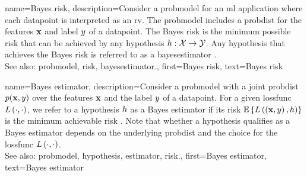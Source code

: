 {name={Bayes risk},
	description={Consider a \gls{probmodel} for an \gls{ml} application where each 
		\gls{datapoint} is interpreted as an \gls{rv}. The \gls{probmodel} includes 
		a \gls{probdist} for the \glspl{feature} ${\bf x}$ and \gls{label} $y$ 
		of a \gls{datapoint}. The Bayes \gls{risk} is the \gls{minimum} 
		possible \gls{risk} that can be achieved by any \gls{hypothesis} $h: \mathcal{X} \rightarrow \mathcal{Y}$. 
		Any \gls{hypothesis} that achieves the Bayes \gls{risk} is referred to as a 
		\gls{bayesestimator} \cite{LC}.
		\\
		See also: \gls{probmodel}, \gls{risk}, \gls{bayesestimator}.},
	first={Bayes risk},
	text={Bayes risk}
}
	
{name={Bayes estimator},
	description={Consider a \gls{probmodel} with a joint \gls{probdist} 
		$p({\bf x},y)$ over the \glspl{feature} ${\bf x}$ and the \gls{label} $y$ 
		of a \gls{datapoint}. For a given \gls{lossfunc} $L\left(\cdot,\cdot \right)$, we refer to a \gls{hypothesis} 
		$h$ as a Bayes \gls{estimator} if its \gls{risk} 
		$\mathbb{E}\left\{L\left(\left( {\bf x},y \right),h \right)\right\}$
		is the \gls{minimum} achievable \gls{risk} \cite{LC}. 
		Note that whether a \gls{hypothesis} qualifies as a Bayes \gls{estimator} depends on 
		the underlying \gls{probdist} and the choice for the \gls{lossfunc} $L\left(\cdot,\cdot \right)$.
		\\
		See also: \gls{probmodel}, \gls{hypothesis}, \gls{estimator}, \gls{risk}.},
	first={Bayes estimator},
	text={Bayes estimator}
}

